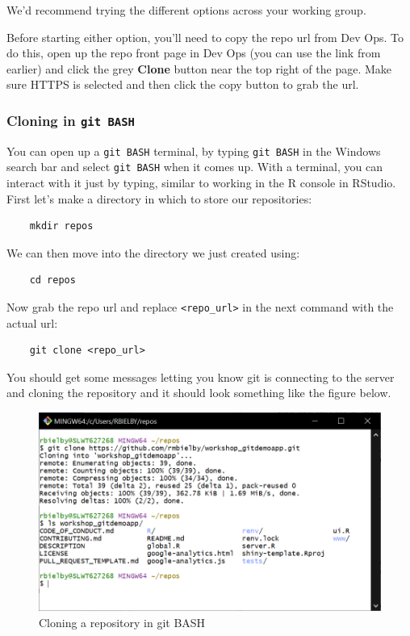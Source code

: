 \documentclass[
  12pt,
]{article}
\begin{document}
We'd recommend trying the different options across your working group.

Before starting either option, you'll need to copy the repo url from Dev
Ops. To do this, open up the repo front page in Dev Ops (you can use the
link from earlier) and click the grey \textbf{Clone} button near the top
right of the page. Make sure HTTPS is selected and then click the copy
button to grab the url.

\hypertarget{cloning-in-git-bash}{%
\subsubsection{\texorpdfstring{Cloning in
\texttt{git\ BASH}}{Cloning in git BASH}}\label{cloning-in-git-bash}}

You can open up a \texttt{git\ BASH} terminal, by typing
\texttt{git\ BASH} in the Windows search bar and select
\texttt{git\ BASH} when it comes up. With a terminal, you can interact
with it just by typing, similar to working in the R console in RStudio.
First let's make a directory in which to store our repositories:

\begin{verbatim}
    mkdir repos
\end{verbatim}

We can then move into the directory we just created using:

\begin{verbatim}
    cd repos
\end{verbatim}

Now grab the repo url and replace
\texttt{\textless{}repo\_url\textgreater{}} in the next command with the
actual url:

\begin{verbatim}
    git clone <repo_url>
\end{verbatim}

You should get some messages letting you know git is connecting to the
server and cloning the repository and it should look something like the
figure below.

\begin{figure}
\includegraphics[width=0.6\linewidth]{images/gitdemo/gitdemo-terminal_clone} \caption{Cloning a repository in git BASH}\label{fig:unnamed-chunk-3}
\end{figure}
\end{document}
